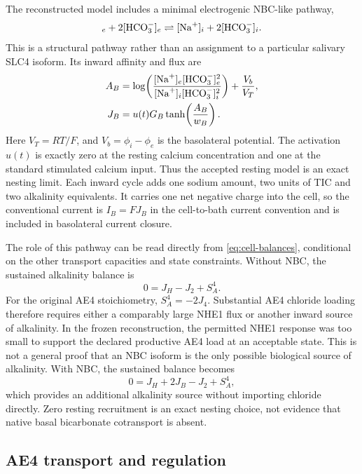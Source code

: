 The reconstructed model includes a minimal electrogenic NBC-like pathway,
\begin{equation*}
    [\Na]_e+2[\HCO]_e \rightleftharpoons [\Na]_i+2[\HCO]_i.
\end{equation*}
This is a structural pathway rather than an assignment to a particular salivary SLC4 isoform. Its inward affinity and flux are
\begin{equation}
\begin{aligned}
    A_B&=\log\!\left(
       \frac{[\mathrm{Na}^{+}]_e[\mathrm{HCO}_{3}^{-}]_e^2}{[\mathrm{Na}^{+}]_i[\mathrm{HCO}_{3}^{-}]_i^2}
       \right)+\frac{V_b}{V_T},\\
    J_B&=u(t)G_B\tanh\!\left(\frac{A_B}{w_B}\right).
\end{aligned}
\label{eq:nbc}
\end{equation}
Here $V_T=RT/F$, and $V_b=\phi_i-\phi_e$ is the basolateral potential. The activation $u(t)$ is exactly zero at the resting calcium concentration and one at the standard stimulated calcium input. Thus the accepted resting model is an exact nesting limit. Each inward cycle adds one sodium amount, two units of TIC and two alkalinity equivalents. It carries one net negative charge into the cell, so the conventional current is $I_B=FJ_B$ in the cell-to-bath current convention and is included in basolateral current closure.

The role of this pathway can be read directly from \cref{eq:cell-balances}, conditional on the other transport capacities and state constraints. Without NBC, the sustained alkalinity balance is
\begin{equation*}
    0=J_H-J_2+S_A^4.
\end{equation*}
For the original AE4 stoichiometry, $S_A^4=-2J_4$. Substantial AE4 chloride loading therefore requires either a comparably large NHE1 flux or another inward source of alkalinity. In the frozen reconstruction, the permitted NHE1 response was too small to support the declared productive AE4 load at an acceptable state. This is not a general proof that an NBC isoform is the only possible biological source of alkalinity. With NBC, the sustained balance becomes
\begin{equation}
    0=J_H+2J_B-J_2+S_A^4,
    \label{eq:alkalinity-balance}
\end{equation}
which provides an additional alkalinity source without importing chloride directly. Zero resting recruitment is an exact nesting choice, not evidence that native basal bicarbonate cotransport is absent.

\subsection{AE4 transport and regulation}

